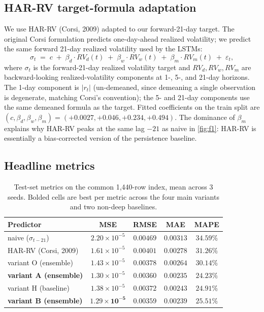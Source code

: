 \documentclass{article}
\begin{document}
\subsection{HAR-RV target-formula adaptation}
\label{app:harrv}

We use HAR-RV (Corsi, 2009) adapted to our forward-21-day target. The original Corsi formulation predicts one-day-ahead realized volatility; we predict the same forward 21-day realized volatility used by the LSTMs:
\[
\sigma_{t} \;=\; c \;+\; \beta_d \cdot RV_d(t) \;+\; \beta_w \cdot RV_w(t) \;+\; \beta_m \cdot RV_m(t) \;+\; \varepsilon_t,
\]
where $\sigma_t$ is the forward-21-day realized volatility target and $RV_d, RV_w, RV_m$ are backward-looking realized-volatility components at 1-, 5-, and 21-day horizons. The 1-day component is $|r_t|$ (un-demeaned, since demeaning a single observation is degenerate, matching Corsi's convention); the 5- and 21-day components use the same demeaned formula as the target. Fitted coefficients on the train split are $(c, \beta_d, \beta_w, \beta_m) = (+0.0027, +0.046, +0.234, +0.494)$. The dominance of $\beta_m$ explains why HAR-RV peaks at the same lag $-21$ as naive in \cref{fig:f1}: HAR-RV is essentially a bias-corrected version of the persistence baseline.

\subsection{Headline metrics}
\label{app:headline}

\begin{table}[H]
\centering
\caption{Test-set metrics on the common 1{,}440-row index, mean across 3 seeds. Bolded cells are best per metric across the four main variants and two non-deep baselines.}
\label{tab:headline}
\small
\begin{tabular}{@{}lcccc@{}}
\toprule
Predictor & MSE & RMSE & MAE & MAPE \\
\midrule
naive ($\sigma_{t-21}$)                & $2.20\!\times\!10^{-5}$ & $0.00469$ & $0.00313$ & $34.59\%$ \\
HAR-RV (Corsi, 2009)                   & $1.61\!\times\!10^{-5}$ & $0.00401$ & $0.00278$ & $31.26\%$ \\
variant O (ensemble)                   & $1.43\!\times\!10^{-5}$ & $0.00378$ & $0.00264$ & $30.14\%$ \\
\textbf{variant A (ensemble)}          & $1.30\!\times\!10^{-5}$ & $0.00360$ & $\mathbf{0.00235}$ & $\mathbf{24.23\%}$ \\
variant H (baseline)                   & $1.38\!\times\!10^{-5}$ & $0.00372$ & $0.00243$ & $24.91\%$ \\
\textbf{variant B (ensemble)}          & $\mathbf{1.29\!\times\!10^{-5}}$ & $\mathbf{0.00359}$ & $0.00239$ & $25.51\%$ \\
\bottomrule
\end{tabular}
\end{table}
\end{document}
